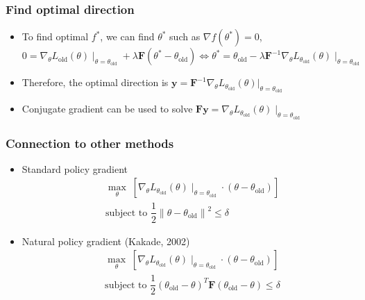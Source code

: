 \documentclass[9pt]{beamer}
\newcommand\norm[1]{\left\lVert#1\right\rVert}
\theoremstyle{remark}
\begin{document}
\begin{frame}
    \frametitle{Find optimal direction}
    \begin{itemize}
        \item To find optimal $f^{*}$, we can find $\theta^{*}$ such as $\nabla f(\theta^{*}) = 0$,
                \[
                    0 = \nabla_{\theta} L_{\text{old}}(\theta) \mid_{\theta = \theta_{\text{old}}} + \lambda \bm{F}(\theta^{*} - \theta_{\text{old}})  \Leftrightarrow \theta^{*} = \theta_{\text{old}} - \lambda \bm{F}^{-1} \nabla_{\theta} L_{\theta_{\text{old}}}(\theta) \mid_{\theta = \theta_{\text{old}}}
                \] 
            \item Therefore, the optimal direction is $\bm{y} = \bm{F}^{-1} \nabla_{\theta} L_{\theta_{\text{old}}}(\theta) |_{\theta = \theta_{\text{old}}}$
            \item Conjugate gradient can be used to solve $\bm{F}\bm{y} = \nabla_{\theta} L_{\theta_{\text{old}}}(\theta) \mid_{\theta = \theta_{\text{old}}}$
    \end{itemize}
\end{frame}

\begin{frame}
    \frametitle{Connection to other methods}
\begin{itemize}
    \item Standard policy gradient 
        \begin{align*}
            &\max_{\theta} \; \left[ \nabla_{\theta}L_{\theta_{\text{old}}}(\theta) \mid_{\theta=\theta_{\text{old}}} \cdot (\theta - \theta_{\text{old}}) \right] \\
            &\text{subject to } \dfrac{1}{2} \norm{\theta - \theta_{\text{old}}}^2 \leq \delta
        \end{align*} 
    \item Natural policy gradient  (Kakade, 2002)
        \begin{align*}
            &\max_{\theta} \; \left[ \nabla_{\theta}L_{\theta_{\text{old}}}(\theta) \mid_{\theta=\theta_{\text{old}}} \cdot (\theta - \theta_{\text{old}}) \right] \\
            &\text{subject to } \dfrac{1}{2}(\theta_{\text{old}} - \theta)^T \bm{F} (\theta_{\text{old}} - \theta) \leq \delta
        \end{align*} 
\end{itemize}
\end{frame}
\end{document}
